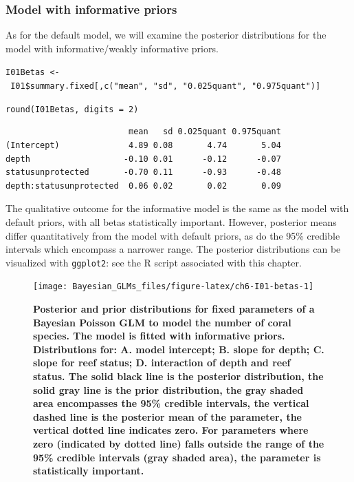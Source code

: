 \documentclass[
]{book}
\begin{document}
\hypertarget{nb-inf-priors}{%
\subsubsection{Model with informative priors}\label{nb-inf-priors}}

As for the default model, we will examine the posterior distributions for the model with informative/weakly informative priors.

\texttt{I01Betas\ \textless{}-\ I01\$summary.fixed{[},c("mean",\ "sd",\ "0.025quant",\ "0.975quant"){]}}

\texttt{round(I01Betas,\ digits\ =\ 2)}

\begin{verbatim}
                         mean   sd 0.025quant 0.975quant
(Intercept)              4.89 0.08       4.74       5.04
depth                   -0.10 0.01      -0.12      -0.07
statusunprotected       -0.70 0.11      -0.93      -0.48
depth:statusunprotected  0.06 0.02       0.02       0.09
\end{verbatim}

The qualitative outcome for the informative model is the same as the model with default priors, with all betas statistically important. However, posterior means differ quantitatively from the model with default priors, as do the 95\% credible intervals which encompass a narrower range. The posterior distributions can be visualized with \texttt{ggplot2}: see the R script associated with this chapter.



\begin{figure}

{\centering \texttt{[image: Bayesian\_GLMs\_files/figure-latex/ch6-I01-betas-1]} 

}

\caption{\textbf{Posterior and prior distributions for fixed parameters of a Bayesian Poisson GLM to model the number of coral species. The model is fitted with informative priors. Distributions for: A. model intercept; B. slope for depth; C. slope for reef status; D. interaction of depth and reef status. The solid black line is the posterior distribution, the solid gray line is the prior distribution, the gray shaded area encompasses the 95\% credible intervals, the vertical dashed line is the posterior mean of the parameter, the vertical dotted line indicates zero. For parameters where zero (indicated by dotted line) falls outside the range of the 95\% credible intervals (gray shaded area), the parameter is statistically important.}}\label{fig:ch6-I01-betas}
\end{figure}
\end{document}
